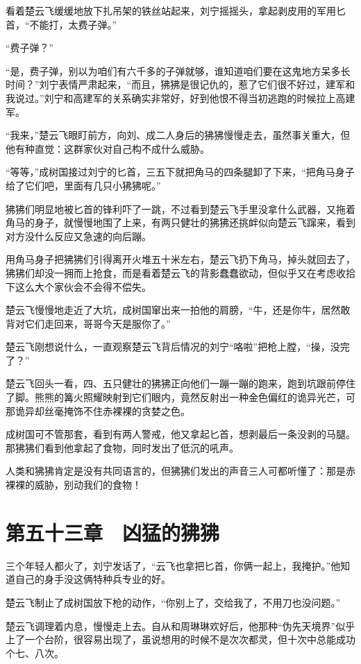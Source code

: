 看着楚云飞缓缓地放下扎吊架的铁丝站起来，刘宁摇摇头，拿起剥皮用的军用匕首，“不能打，太费子弹。”

“费子弹？”

“是，费子弹，别以为咱们有六千多的子弹就够，谁知道咱们要在这鬼地方呆多长时间？”刘宁表情严肃起来，“而且，狒狒是很记仇的，惹了它们很不好过，建军和我说过。”刘宁和高建军的关系确实非常好，好到他恨不得当初逃跑的时候拉上高建军。

“我来，”楚云飞眼盯前方，向刘、成二人身后的狒狒慢慢走去，虽然事关重大，但他有种直觉：这群家伙对自己构不成什么威胁。

“等等，”成树国接过刘宁的匕首，三五下就把角马的四条腿卸了下来，“把角马身子给了它们吧，里面有几只小狒狒呢。”

狒狒们明显地被匕首的锋利吓了一跳，不过看到楚云飞手里没拿什么武器，又拖着角马的身子，就慢慢地围了上来，有两只健壮的狒狒还挑衅似向楚云飞蹿来，看到对方没什么反应又急速的向后蹦。

用角马身子把狒狒们引得离开火堆五十米左右，楚云飞扔下角马，掉头就回去了，狒狒们却没一拥而上抢食，而是看着楚云飞的背影蠢蠢欲动，但似乎又在考虑收拾下这么大个家伙会不会得不偿失。

楚云飞慢慢地走近了大坑，成树国窜出来一拍他的肩膀，“牛，还是你牛，居然敢背对它们走回来，哥哥今天是服你了。”

楚云飞刚想说什么，一直观察楚云飞背后情况的刘宁“咯啦”把枪上膛，“操，没完了？”

楚云飞回头一看，四、五只健壮的狒狒正向他们一蹦一蹦的跑来，跑到坑跟前停住了脚。熊熊的篝火照耀映射到它们眼内，竟然反射出一种金色偏红的诡异光芒，可那诡异却丝毫掩饰不住赤裸裸的贪婪之色。

成树国可不管那套，看到有两人警戒，他又拿起匕首，想剥最后一条没剥的马腿。那狒狒们看到他拿起了食物，同时发出了低沉的吼声。

人类和狒狒肯定是没有共同语言的，但狒狒们发出的声音三人可都听懂了：那是赤裸裸的威胁，别动我们的食物！

\section{第五十三章　凶猛的狒狒}

三个年轻人都火了，刘宁发话了，“云飞也拿把匕首，你俩一起上，我掩护。”他知道自己的身手没这俩特种兵专业的好。

楚云飞制止了成树国放下枪的动作，“你别上了，交给我了，不用刀也没问题。”

楚云飞调理着内息，慢慢走上去。自从和周琳琳欢好后，他那种“伪先天境界”似乎上了一个台阶，很容易出现了，虽说想用的时候不是次次都灵，但十次中总能成功个七、八次。

